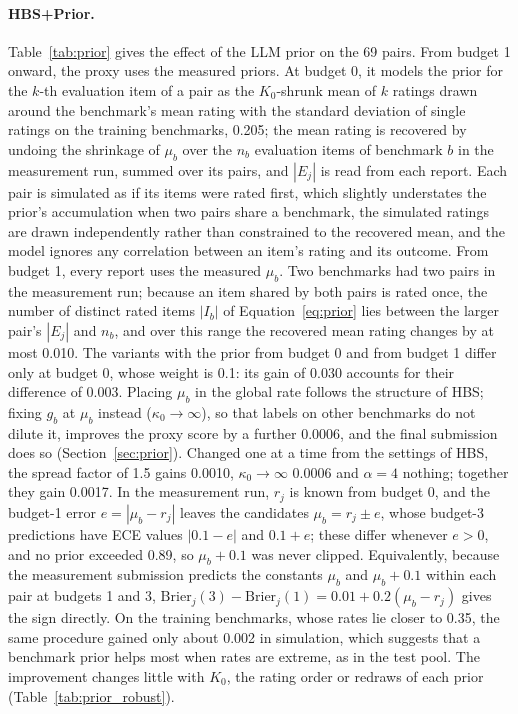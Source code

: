 \documentclass{article}
\newcommand{\Brier}{\mathrm{Brier}}
\begin{document}
\paragraph{HBS+Prior.} Table~\ref{tab:prior} gives the effect of the LLM prior on the 69 pairs. From budget 1 onward, the proxy uses the measured priors. At budget 0, it models the prior for the $k$-th evaluation item of a pair as the $K_0$-shrunk mean of $k$ ratings drawn around the benchmark's mean rating with the standard deviation of single ratings on the training benchmarks, 0.205; the mean rating is recovered by undoing the shrinkage of $\mu_b$ over the $n_b$ evaluation items of benchmark $b$ in the measurement run, summed over its pairs, and $|E_j|$ is read from each report. Each pair is simulated as if its items were rated first, which slightly understates the prior's accumulation when two pairs share a benchmark, the simulated ratings are drawn independently rather than constrained to the recovered mean, and the model ignores any correlation between an item's rating and its outcome. From budget 1, every report uses the measured $\mu_b$. Two benchmarks had two pairs in the measurement run; because an item shared by both pairs is rated once, the number of distinct rated items $|I_b|$ of Equation~\eqref{eq:prior} lies between the larger pair's $|E_j|$ and $n_b$, and over this range the recovered mean rating changes by at most 0.010. The variants with the prior from budget 0 and from budget 1 differ only at budget 0, whose weight is 0.1: its gain of 0.030 accounts for their difference of 0.003. Placing $\mu_b$ in the global rate follows the structure of HBS; fixing $g_b$ at $\mu_b$ instead ($\kappa_0 \to \infty$), so that labels on other benchmarks do not dilute it, improves the proxy score by a further 0.0006, and the final submission does so (Section~\ref{sec:prior}). Changed one at a time from the settings of HBS, the spread factor of 1.5 gains 0.0010, $\kappa_0 \to \infty$ 0.0006 and $\alpha = 4$ nothing; together they gain 0.0017. In the measurement run, $r_j$ is known from budget 0, and the budget-1 error $e = |\mu_b - r_j|$ leaves the candidates $\mu_b = r_j \pm e$, whose budget-3 predictions have ECE values $|0.1 - e|$ and $0.1 + e$; these differ whenever $e > 0$, and no prior exceeded 0.89, so $\mu_b + 0.1$ was never clipped. Equivalently, because the measurement submission predicts the constants $\mu_b$ and $\mu_b + 0.1$ within each pair at budgets 1 and 3, $\Brier_j(3) - \Brier_j(1) = 0.01 + 0.2(\mu_b - r_j)$ gives the sign directly. On the training benchmarks, whose rates lie closer to 0.35, the same procedure gained only about 0.002 in simulation, which suggests that a benchmark prior helps most when rates are extreme, as in the test pool. The improvement changes little with $K_0$, the rating order or redraws of each prior (Table~\ref{tab:prior_robust}).
\end{document}
